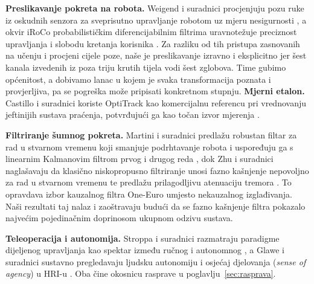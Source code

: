 \textbf{Preslikavanje pokreta na robota.} Weigend i suradnici procjenjuju pozu
ruke iz oskudnih senzora za sveprisutno upravljanje robotom uz mjeru
nesigurnosti \cite[str.~1]{weigend2023}, a okvir iRoCo probabilističkim
diferencijabilnim filtrima uravnotežuje preciznost upravljanja i slobodu
kretanja korisnika \cite[str.~1]{weigend2024}. Za razliku od tih pristupa
zasnovanih na učenju i procjeni cijele poze, naše je preslikavanje izravno i
eksplicitno jer šest kanala izvedenih iz poza triju krutih tijela vodi šest
zglobova. Time gubimo općenitost, a dobivamo lanac u kojem je svaka
transformacija poznata i provjerljiva, pa se pogreška može pripisati konkretnom
stupnju. \textbf{Mjerni etalon.} Castillo i suradnici koriste OptiTrack kao
komercijalnu referencu pri vrednovanju jeftinijih sustava praćenja, potvrđujući
ga kao točan izvor mjerenja \cite[str.~7]{castillo2025}.

\textbf{Filtriranje šumnog pokreta.} Martini i suradnici predlažu robustan
filtar za rad u stvarnom vremenu koji smanjuje podrhtavanje robota i uspoređuju
ga s linearnim Kalmanovim filtrom prvog i drugog reda
\cite[str.~5]{martini2024}, dok Zhu i suradnici naglašavaju da klasično
niskopropusno filtriranje unosi fazno kašnjenje nepovoljno za rad u stvarnom
vremenu te predlažu prilagodljivu atenuaciju tremora \cite[str.~2]{zhu2022}. To
opravdava izbor kauzalnog filtra One-Euro \cite{casiez2012} umjesto nekauzalnog
izglađivanja. Naši rezultati taj nalaz i zaoštravaju budući da se fazno kašnjenje filtra
pokazalo najvećim pojedinačnim doprinosom ukupnom odzivu sustava.

\textbf{Teleoperacija i autonomija.} Stroppa i suradnici razmatraju paradigme
dijeljenog upravljanja kao spektar između ručnog i autonomnog
\cite[str.~5]{stroppa2023}, a Glawe i suradnici sustavno pregledavaju ljudsku
autonomiju i osjećaj djelovanja (\emph{sense of agency}) u HRI-u
\cite[str.~1]{glawe2026}. Oba čine okosnicu rasprave u
poglavlju~\ref{sec:rasprava}.

\FloatBarrier
